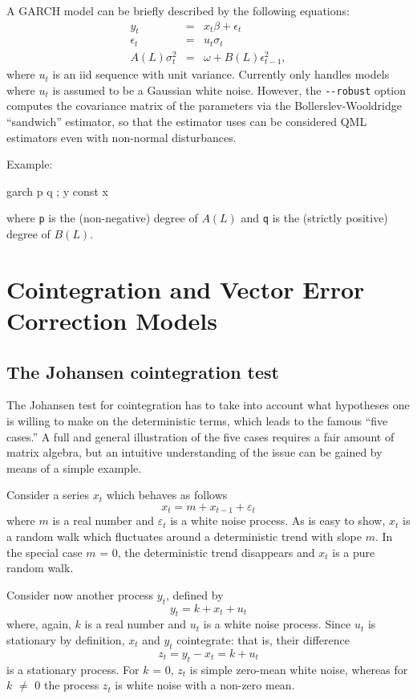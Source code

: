 A GARCH model can be briefly described by the following equations:
\begin{eqnarray}
  \label{eq:garch-meaneq}
  y_t &  = & x_t \beta + \epsilon_t \\
  \label{eq:garch-epseq}
  \epsilon_t &  = & u_t \sigma_t \\
  \label{eq:garch-vareq}
  A(L) \sigma^2_t &  = & \omega + B(L) \epsilon_{t-1}^2 ,
\end{eqnarray}
where $u_t$ is an iid sequence with unit variance. Currently
 only handles models where $u_t$ is assumed to be a
Gaussian white noise. However, the \verb|--robust| option computes the
covariance matrix of the parameters via the Bollerslev-Wooldridge
``sandwich'' estimator, so that the estimator  uses can be
considered QML estimators even with non-normal disturbances.

Example:
\begin{code}
  garch p q ; y const x
\end{code}
where \verb|p| is the (non-negative) degree of $A(L)$ and \verb|q| is
the (strictly positive) degree of $B(L)$.

\section{Cointegration and Vector Error Correction Models}
\label{vecm-explanation}

\subsection{The Johansen cointegration test}
\label{sec:johansen-test}

The Johansen test for cointegration has to take into account what
hypotheses one is willing to make on the deterministic terms, which
leads to the famous ``five cases.'' A full and general illustration of
the five cases requires a fair amount of matrix algebra, but an
intuitive understanding of the issue can be gained by means of a
simple example.
    
Consider a series $x_t$ which behaves as follows
%      
\[ x_t = m + x_{t-1} + \varepsilon_t \] 
%
where $m$ is a real number and $\varepsilon_t$ is a white noise
process. As is easy to show, $x_t$ is a random walk which fluctuates
around a deterministic trend with slope $m$. In the special case $m$ =
0, the deterministic trend disappears and $x_t$ is a pure random walk.
    
Consider now another process $y_t$, defined by
%      
\[ y_t = k + x_t + u_t \] 
%
where, again, $k$ is a real number and $u_t$ is a white noise process.
Since $u_t$ is stationary by definition, $x_t$ and $y_t$ cointegrate:
that is, their difference
%      
\[ z_t = y_t - x_t = k + u_t \]
%	
is a stationary process. For $k$ = 0, $z_t$ is simple zero-mean white
noise, whereas for $k$ $\ne$ 0 the process $z_t$ is white noise with a
non-zero mean.
  
